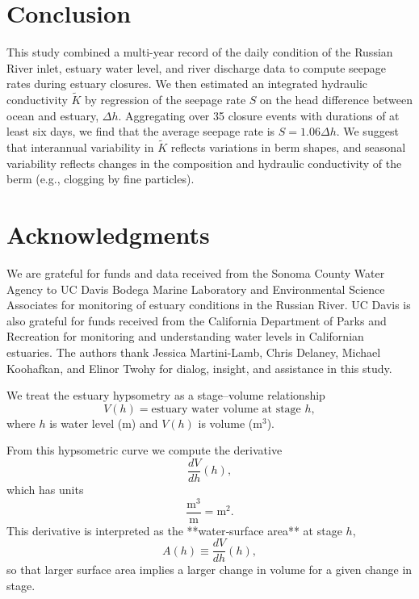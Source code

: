 \documentclass[preprint,12pt,authoryear]{elsarticle}
\begin{document}
\label{sec:discussion}

\section{Conclusion}

This study combined a multi-year record of the daily condition of the Russian River inlet, estuary water level, and river discharge data to compute seepage rates during estuary closures.
We then estimated an integrated hydraulic conductivity $\tilde K$ by regression of the seepage rate $S$ on the head difference between ocean and estuary, $\Delta h$. 
Aggregating over 35 closure events with durations of at least six days, we find that the average seepage rate is $S = 1.06 \Delta h$.
We suggest that interannual variability in $\tilde K$ reflects variations in berm shapes, and seasonal variability reflects changes in the composition and hydraulic conductivity of the berm (e.g., clogging by fine particles).


\section{Acknowledgments}
We are grateful for funds and data received from the Sonoma County Water Agency to UC Davis Bodega Marine Laboratory and Environmental Science Associates for monitoring of estuary conditions in the Russian River. UC Davis is also grateful for funds received from the California Department of Parks and Recreation for monitoring and understanding water levels in Californian estuaries. The authors thank Jessica Martini-Lamb, Chris Delaney, Michael Koohafkan, and Elinor Twohy for dialog, insight, and assistance in this study.
 



We treat the estuary hypsometry as a stage–volume relationship
\[
V(h) = \text{estuary water volume at stage } h,
\]
where \(h\) is water level (m) and \(V(h)\) is volume (m\(^3\)).

From this hypsometric curve we compute the derivative
\[
\frac{dV}{dh}(h),
\]
which has units
\[
\frac{\text{m}^3}{\text{m}} = \text{m}^2.
\]
This derivative is interpreted as the **water‐surface area** at stage \(h\),
\[
A(h) \equiv \frac{dV}{dh}(h),
\]
so that larger surface area implies a larger change in volume for a given change in stage.
\end{document}
